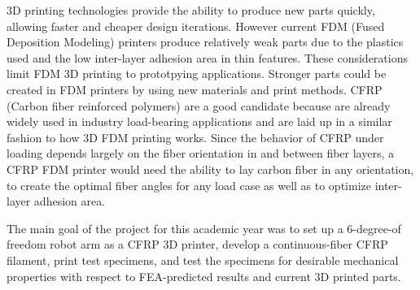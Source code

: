 
3D printing technologies provide the ability to produce new parts quickly, allowing faster and cheaper design iterations. However current FDM (Fused Deposition Modeling) printers produce relatively weak parts due to the plastics used and the low inter-layer adhesion area in thin features. These considerations limit FDM 3D printing to prototpying applications. Stronger parts could be created in FDM printers by using new materials and print methods. CFRP (Carbon fiber reinforced polymers) are a good candidate because are already widely used in industry load-bearing applications and are laid up in a similar fashion to how 3D FDM printing works. Since the behavior of CFRP under loading depends largely on the fiber orientation in and between fiber layers, a CFRP FDM printer would need the ability to lay carbon fiber in any orientation, to create the optimal fiber angles for any load case as well as to optimize inter-layer adhesion area. 

The main goal of the project for this academic year was to set up a 6-degree-of freedom robot arm as a CFRP 3D printer, develop a continuous-fiber CFRP filament, print test specimens, and test the specimens for desirable mechanical properties with respect to FEA-predicted results and current 3D printed parts.
